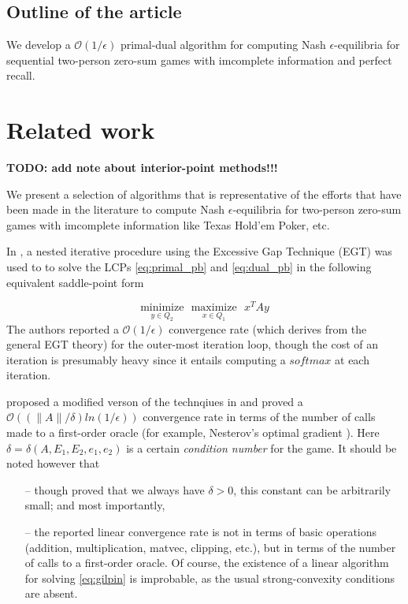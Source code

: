 \documentclass{article} %
\begin{document}
\subsection{Outline of the article}
We develop a $\mathcal{O}(1/\epsilon)$ primal-dual algorithm for computing Nash
$\epsilon$-equilibria for sequential two-person zero-sum games with
imcomplete information and perfect recall.




\section{Related work}
\label{sec:related_work}
\textbf{TODO: add note about interior-point methods!!!}

We present a selection of algorithms that is representative of the efforts that have been made in the literature to compute Nash $\epsilon$-equilibria for two-person zero-sum games with imcomplete information like Texas Hold'em Poker, etc.

In \cite{hoda2010smoothing}, a nested iterative procedure using the Excessive Gap Technique (EGT) \cite{nesterov2005excessive} was used to to solve the LCPs \eqref{eq:primal_pb} and \eqref{eq:dual_pb} in the following equivalent saddle-point form

\begin{equation}
  \underset{y \in Q_2}{\text{minimize}}\text{ }\underset{x \in Q_1}{\text{maximize}}\text{ }x^TAy
  \label{eq:gilpin}
\end{equation}
The authors reported a $\mathcal{O}(1/\epsilon)$ convergence rate (which derives from the general EGT theory) for the outer-most iteration loop, though the cost of an iteration is presumably heavy since it entails computing a $softmax$ at each iteration.

\cite{gilpinfirst} proposed a modified verson of the technqiues in \cite{hoda2010smoothing} and  proved a $\mathcal{O}\left(\left(\|A\| / \delta\right) ln\left(1 / \epsilon\right)\right)$ convergence rate in terms of the number of calls made to a first-order oracle (for example, Nesterov's optimal gradient \cite{nesterov1983}). Here $\delta = \delta(A, E_1, E_2, e_1, e_2)$ is a certain \textit{condition number} for the game.
It should be noted however that
\begin{itemize}
\item[--] though \cite{gilpinfirst} proved that we always have $\delta > 0$, this constant can be arbitrarily small; and most importantly,
\item[--] the reported linear convergence rate is not in terms of basic operations (addition, multiplication, matvec, clipping, etc.), but in terms of the number of calls to a first-order oracle. Of course, the existence of a linear algorithm for solving \eqref{eq:gilpin} is improbable, as the usual strong-convexity conditions are absent.
\end{itemize}
\end{document}
